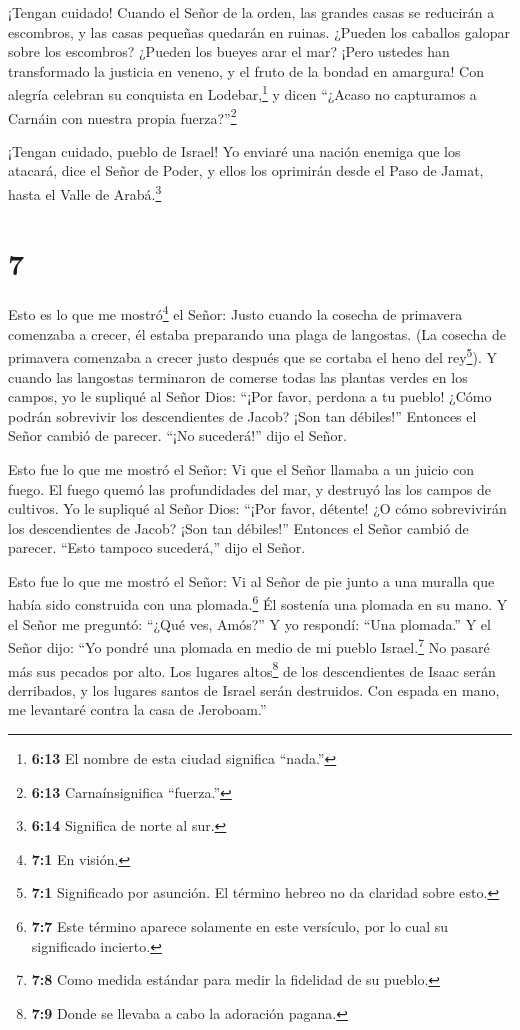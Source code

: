  ¡Tengan cuidado! Cuando el Señor de la orden, las grandes
casas se reducirán a escombros, y las casas pequeñas quedarán en ruinas.
 ¿Pueden los caballos galopar sobre los escombros? ¿Pueden
los bueyes arar el mar? ¡Pero ustedes han transformado la justicia en
veneno, y el fruto de la bondad en amargura!  Con alegría
celebran su conquista en Lodebar,\footnote{\textbf{6:13} El nombre de
  esta ciudad significa ``nada.''} y dicen ``¿Acaso no capturamos a
Carnáin con nuestra propia fuerza?''\footnote{\textbf{6:13}
  Carnaínsignifica ``fuerza.''}

 ¡Tengan cuidado, pueblo de Israel! Yo enviaré una nación
enemiga que los atacará, dice el Señor de Poder, y ellos los oprimirán
desde el Paso de Jamat, hasta el Valle de Arabá.\footnote{\textbf{6:14}
  Significa de norte al sur.}

\hypertarget{section-6}{%
\section{7}\label{section-6}}

 Esto es lo que me mostró\footnote{\textbf{7:1} En visión.}
el Señor: Justo cuando la cosecha de primavera comenzaba a crecer, él
estaba preparando una plaga de langostas. (La cosecha de primavera
comenzaba a crecer justo después que se cortaba el heno del
rey\footnote{\textbf{7:1} Significado por asunción. El término hebreo no
  da claridad sobre esto.}).  Y cuando las langostas
terminaron de comerse todas las plantas verdes en los campos, yo le
supliqué al Señor Dios: ``¡Por favor, perdona a tu pueblo! ¿Cómo podrán
sobrevivir los descendientes de Jacob? ¡Son tan débiles!'' 
Entonces el Señor cambió de parecer. ``¡No sucederá!'' dijo el Señor.

 Esto fue lo que me mostró el Señor: Vi que el Señor llamaba
a un juicio con fuego. El fuego quemó las profundidades del mar, y
destruyó las los campos de cultivos.  Yo le supliqué al
Señor Dios: ``¡Por favor, détente! ¿O cómo sobrevivirán los
descendientes de Jacob? ¡Son tan débiles!''  Entonces el
Señor cambió de parecer. ``Esto tampoco sucederá,'' dijo el Señor.

 Esto fue lo que me mostró el Señor: Vi al Señor de pie
junto a una muralla que había sido construida con una
plomada.\footnote{\textbf{7:7} Este término aparece solamente en este
  versículo, por lo cual su significado incierto.} Él sostenía una
plomada en su mano.  Y el Señor me preguntó: ``¿Qué ves,
Amós?'' Y yo respondí: ``Una plomada.'' Y el Señor dijo: ``Yo pondré una
plomada en medio de mi pueblo Israel.\footnote{\textbf{7:8} Como medida
  estándar para medir la fidelidad de su pueblo.} No pasaré más sus
pecados por alto.  Los lugares altos\footnote{\textbf{7:9}
  Donde se llevaba a cabo la adoración pagana.} de los descendientes de
Isaac serán derribados, y los lugares santos de Israel serán destruidos.
Con espada en mano, me levantaré contra la casa de Jeroboam.''

